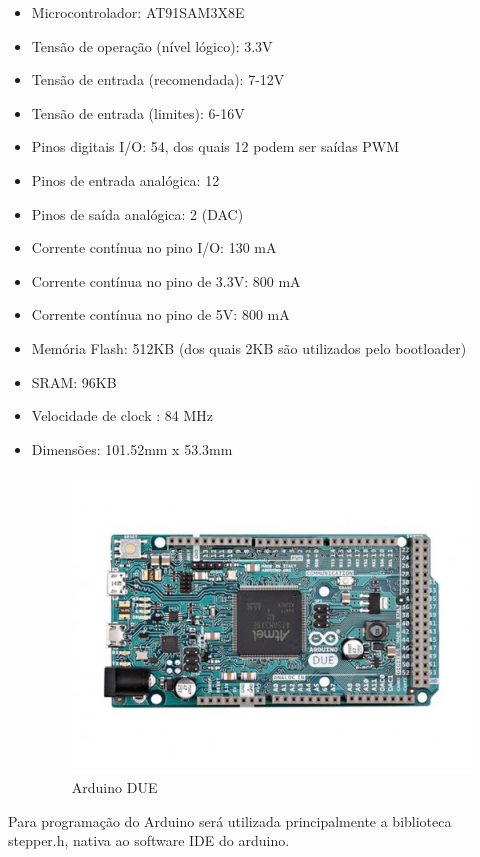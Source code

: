 \begin{itemize}[noitemsep]
\item Microcontrolador:  	AT91SAM3X8E
\item Tensão de operação (nível lógico): 3.3V
\item Tensão de entrada (recomendada): 7-12V
\item Tensão de entrada (limites): 6-16V
\item Pinos digitais I/O: 54, dos quais 12 podem ser saídas PWM
\item Pinos de entrada analógica: 12
\item Pinos de saída analógica: 2 (DAC)
\item Corrente contínua no pino I/O: 130 mA
\item Corrente contínua no pino de 3.3V: 800 mA
\item Corrente contínua no pino de 5V: 800 mA
\item Memória Flash: 512KB (dos quais 2KB são utilizados pelo bootloader)
\item SRAM: 96KB
\item Velocidade de clock : 84 MHz
\item Dimensões:  101.52mm x 53.3mm
\begin{figure}[H]
	\centering	\includegraphics[keepaspectratio=true,scale=0.8]{figuras/ard_due.jpg}
	\caption{Arduino DUE}
	\label{ard_due}
\end{figure}
\end{itemize}

Para programação do Arduino será utilizada principalmente a biblioteca stepper.h, nativa ao software IDE do arduino.

